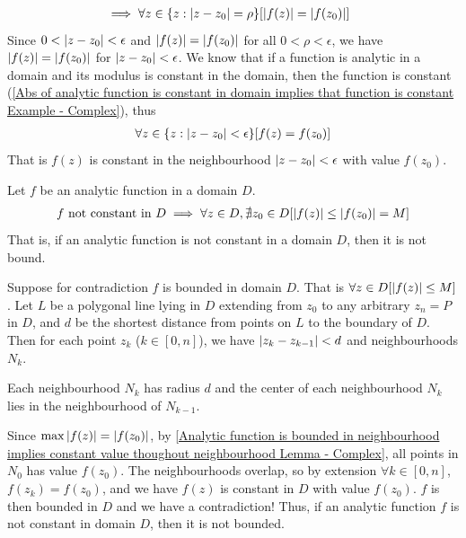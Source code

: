 \documentclass[12pt, english]{book}
\makeatletter
\renewenvironment{proof}[1][\proofname]{\par
	\pushQED{\qed}%
	\normalfont \topsep6\p@\@plus6\p@\relax
	\list{}{%
		\settowidth{\leftmargin}{\itshape\proofname:\hskip\labelsep}%
		\setlength{\labelwidth}{0pt}%
		\setlength{\itemindent}{-\leftmargin}%
		}%
	\item[\hskip\labelsep\itshape#1\@addpunct{:}]\ignorespaces
	}{\popQED\endlist\@endpefalse}
\makeatother
\begin{document}
\begin{proof}
\begin{align*}
			&\implies \forall z \in \{z : \abs{z - z_0} = \rho\}[\abs{f(z)} = \abs{f(z_0)}]
		\end{align*}
		Since \(0 < \abs{z - z_0} < \epsilon\) and \(\abs{f(z)} = \abs{f(z_0)}\) for all \(0<\rho<\epsilon\), we have \(\abs{f(z)} = \abs{f(z_0)}\) for \(\abs{z-z_0} < \epsilon\). We know that if a function is analytic in a domain and its modulus is constant in the domain, then the function is constant (\cref{Abs of analytic function is constant in domain implies that function is constant Example - Complex}), thus 
		\begin{align*}
			\forall z \in \{z : \abs{z-z_0}<\epsilon\} [f(z) = f(z_0)]
		\end{align*}
		That is \(f(z)\) is constant in the neighbourhood \(\abs{z-z_0}<\epsilon\) with value \(f(z_0)\).
	\end{proof}
	
	\begin{theorem}
		\label{Maximum Modulus Principle Theorem - Complex}
		Let \(f\) be an analytic function in a domain \(D\).
		\begin{align*}
			f \text{ not constant in } D \implies \forall z \in D, \nexists z_0 \in D [\abs{f(z)} \leq \abs{f(z_0)} = M]
		\end{align*}
		That is, if an analytic function is not constant in a domain \(D\), then it is not bound.
	\end{theorem}
	\begin{proof}
		Suppose for contradiction \(f\) is bounded in domain \(D\). That is \(\forall z \in D [\abs{f(z)} \leq M]\). Let \(L\) be a polygonal line lying in \(D\) extending from \(z_0\) to any arbitrary \(z_n = P\) in \(D\), and \(d\) be the shortest distance from points on \(L\) to the boundary of \(D\). Then for each point \(z_k\) (\(k \in [0, n]\)), we have \(\abs{z_k - z_{k-1}} < d\) and neighbourhoods \(N_k\).
		
		Each neighbourhood \(N_k\) has radius \(d\) and the center of each neighbourhood \(N_k\) lies in the neighbourhood of \(N_{k-1}\).
		
		Since \(\max \abs{f(z)} = \abs{f(z_0)}\), by \cref{Analytic function is bounded in neighbourhood implies constant value thoughout neighbourhood Lemma - Complex}, all points in \(N_0\) has value \(f(z_0)\). The neighbourhoods overlap, so by extension \(\forall k \in [0, n]\), \(f(z_k) = f(z_0)\), and we have \(f(z)\) is constant in \(D\) with value \(f(z_0)\). \(f\) is then bounded in \(D\) and we have a contradiction! Thus, if an analytic function \(f\) is not constant in domain \(D\), then it is not bounded.
	\end{proof}
\end{document}
